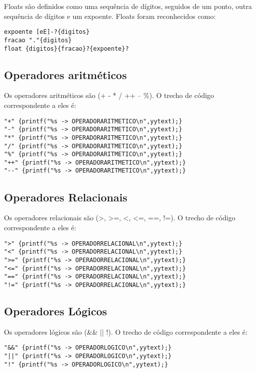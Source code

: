 \documentclass[a4paper,10pt]{article}
\begin{document}
Floats são definidos como uma sequência de dígitos, seguidos de um ponto, outra sequência de dígitos e um expoente. Floats foram
reconhecidos como:
\begin{verbatim}
expoente [eE]-?{digitos} 
fracao "."{digitos}
float {digitos}{fracao}?{expoente}?
\end{verbatim}  


  \subsection{Operadores aritméticos}
  Os operadores aritméticos são (+  -  *  /  ++  -- \%). O trecho de código correspondente a eles é:
  \begin{verbatim}
"+" {printf("%s -> OPERADORARITMETICO\n",yytext);}
"-" {printf("%s -> OPERADORARITMETICO\n",yytext);}
"*" {printf("%s -> OPERADORARITMETICO\n",yytext);}
"/" {printf("%s -> OPERADORARITMETICO\n",yytext);}
"%" {printf("%s -> OPERADORARITMETICO\n",yytext);}
"++" {printf("%s -> OPERADORARITMETICO\n",yytext);}
"--" {printf("%s -> OPERADORARITMETICO\n",yytext);}
  \end{verbatim}


  \subsection{Operadores Relacionais}
  Os operadores relacionais são (>, >=, <, <=, ==, !=). O trecho de código correspondente a eles é:
  \begin{verbatim}
">" {printf("%s -> OPERADORRELACIONAL\n",yytext);}
"<" {printf("%s -> OPERADORRELACIONAL\n",yytext);}
">=" {printf("%s -> OPERADORRELACIONAL\n",yytext);}
"<=" {printf("%s -> OPERADORRELACIONAL\n",yytext);}
"==" {printf("%s -> OPERADORRELACIONAL\n",yytext);}
"!=" {printf("%s -> OPERADORRELACIONAL\n",yytext);}
  \end{verbatim}

  \subsection{Operadores Lógicos}
  Os operadores lógicos são (&& || !). O trecho de código correspondente a eles é:
  \begin{verbatim}
"&&" {printf("%s -> OPERADORLOGICO\n",yytext);}
"||" {printf("%s -> OPERADORLOGICO\n",yytext);}
"!" {printf("%s -> OPERADORLOGICO\n",yytext);}
  \end{verbatim}
\end{document}

